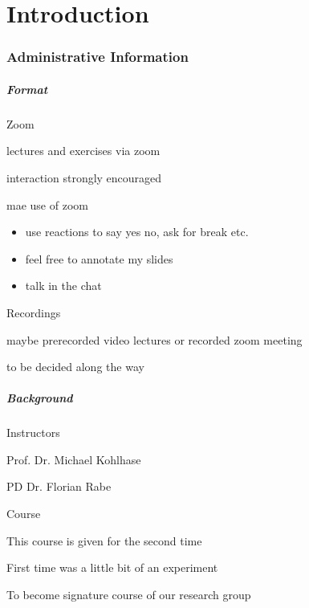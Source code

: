 \part{Introduction}

\section{Administrative Information}

\begin{frame}\frametitle{Format}
\begin{blockitems}{Zoom}
\item lectures and exercises via zoom
\item interaction strongly encouraged
\item mae use of zoom
 \begin{itemize}
 \item use reactions to say yes no, ask for break etc.
 \item feel free to annotate my slides
 \item talk in the chat
 \end{itemize}
\end{blockitems}

\begin{blockitems}{Recordings}
\item maybe prerecorded video lectures or recorded zoom meeting
\item to be decided along the way
\end{blockitems}
\end{frame}


\begin{frame}\frametitle{Background}
\begin{blockitems}{Instructors}
\item Prof. Dr. Michael Kohlhase 
\item PD Dr. Florian Rabe 
\end{blockitems}

\begin{blockitems}{Course}
\item This course is given for the second time
\item First time was a little bit of an experiment
\item To become signature course of our research group 
\end{blockitems}
\end{frame}

